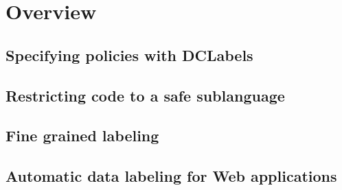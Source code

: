 \section{Overview}
\label{sec:overview}
\subsection{Specifying policies with DCLabels}
\subsection{Restricting code to a safe sublanguage}
\subsection{Fine grained labeling}
\subsection{Automatic data labeling for Web applications}
